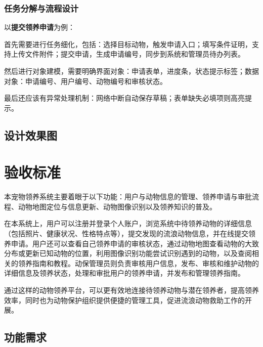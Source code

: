 \documentclass[12pt,a4paper,UTF8]{article}
\begin{document}
\subsubsection{任务分解与流程设计}

以\textbf{提交领养申请}为例：

首先需要进行任务细化，包括：选择目标动物，触发申请入口；填写条件证明，支持上传文件附件；提交申请，生成申请编号，同步到系统和管理员待办列表。

然后进行对象建模，需要明确界面对象：申请表单，进度条，状态提示标签；数据对象：申请编号、用户编号、动物编号和审核状态。

最后还应该有异常处理机制：网络中断自动保存草稿；表单缺失必填项则高亮提示。

\subsection{设计效果图}




\section{验收标准}

本宠物领养系统主要着眼于以下功能：用户与动物信息的管理、领养申请与审批流程、动物地图定位与信息更新、动物图像识别以及领养知识的普及。

在本系统上，用户可以注册并登录个人账户，浏览系统中待领养动物的详细信息（包括照片、健康状况、性格特点等），提交发现的流浪动物信息，并在线提交领养申请。用户还可以查看自己领养申请的审核状态，通过动物地图查看动物的大致分布或更新已知动物的位置，利用图像识别功能尝试识别遇到的动物，以及查阅相关的领养指南和教程。动保管理员则负责审核用户信息，发布、审核和维护动物的详细信息及领养状态，处理和审批用户的领养申请，并发布和管理领养指南。

通过这样的动物领养平台，可以更有效地连接待领养动物与潜在领养者，提高领养效率，同时也为动物保护组织提供便捷的管理工具，促进流浪动物救助工作的开展。

\subsection{功能需求}
\end{document}
